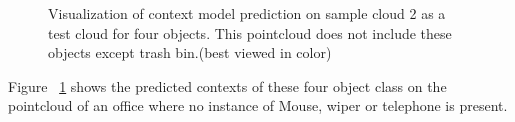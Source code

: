 \begin{figure} [htp]
\begin{center}
  \end{center}
  \caption[Visualization of context model prediction on sample cloud 2 as a test cloud.]
  {Visualization of context model prediction on sample cloud 2 as a test cloud for four objects. This pointcloud does not include 
  these objects except trash bin.(best viewed in color)}
  \label{ContextPrediction_Test_512.figure:edge}
\end{figure}

Figure ~\ref{ContextPrediction_Test_512.figure:edge} shows the predicted contexts of these four object class on the 
pointcloud of an office where no instance of Mouse, wiper or telephone is present.

% 
% 
% 
% 
% 
% 
% 
% 
